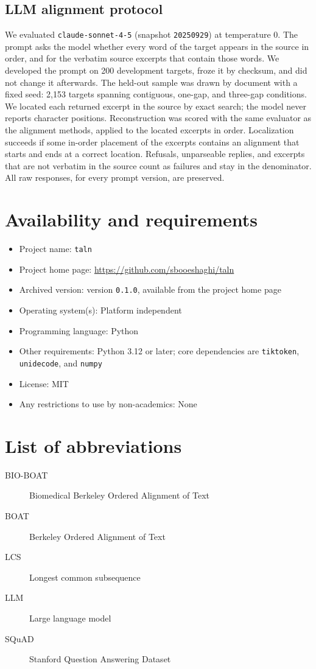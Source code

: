 \documentclass[pdflatex,lineno,referee,sn-vancouver-num]{sn-jnl}
\theoremstyle{thmstyleone}
\theoremstyle{thmstylethree}
\theoremstyle{thmstyletwo}
\begin{document}
\subsection{LLM alignment protocol}
We evaluated \texttt{claude-sonnet-4-5} (snapshot \texttt{20250929}) at temperature 0. The prompt asks the model whether every word of the target appears in the source in order, and for the verbatim source excerpts that contain those words. We developed the prompt on 200 development targets, froze it by checksum, and did not change it afterwards. The held-out sample was drawn by document with a fixed seed: 2,153 targets spanning contiguous, one-gap, and three-gap conditions. We located each returned excerpt in the source by exact search; the model never reports character positions. Reconstruction was scored with the same evaluator as the alignment methods, applied to the located excerpts in order. Localization succeeds if some in-order placement of the excerpts contains an alignment that starts and ends at a correct location. Refusals, unparseable replies, and excerpts that are not verbatim in the source count as failures and stay in the denominator. All raw responses, for every prompt version, are preserved.

\section{Availability and requirements}
\begin{itemize}
\item Project name: \texttt{taln}
\item Project home page: \href{https://github.com/sbooeshaghi/taln}{https://github.com/sbooeshaghi/taln}
\item Archived version: version \texttt{0.1.0}, available from the project home page
\item Operating system(s): Platform independent
\item Programming language: Python
\item Other requirements: Python 3.12 or later; core dependencies are \texttt{tiktoken}, \texttt{unidecode}, and \texttt{numpy}
\item License: MIT
\item Any restrictions to use by non-academics: None
\end{itemize}

\section*{List of abbreviations}
\begin{description}
\item[BIO-BOAT] Biomedical Berkeley Ordered Alignment of Text
\item[BOAT] Berkeley Ordered Alignment of Text
\item[LCS] Longest common subsequence
\item[LLM] Large language model
\item[SQuAD] Stanford Question Answering Dataset
\end{description}
\end{document}

